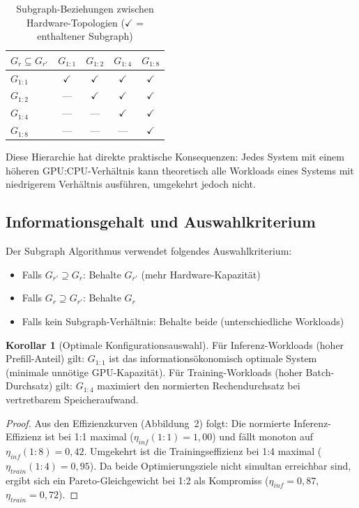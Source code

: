 ﻿\documentclass[a4paper,12pt]{article}
\theoremstyle{definition}
\newtheorem{korollar}{Korollar}
\begin{document}
\begin{table}[h!]
\centering
\caption{Subgraph-Beziehungen zwischen Hardware-Topologien ($\checkmark$ = enthaltener Subgraph)}
\begin{tabular}{l|cccc}
\toprule
$G_r \subseteq G_{r'}$ & $G_{1:1}$ & $G_{1:2}$ & $G_{1:4}$ & $G_{1:8}$ \\
\midrule
$G_{1:1}$ & $\checkmark$ & $\checkmark$ & $\checkmark$ & $\checkmark$ \\
$G_{1:2}$ & ---          & $\checkmark$ & $\checkmark$ & $\checkmark$ \\
$G_{1:4}$ & ---          & ---          & $\checkmark$ & $\checkmark$ \\
$G_{1:8}$ & ---          & ---          & ---          & $\checkmark$ \\
\bottomrule
\end{tabular}
\end{table}

Diese Hierarchie hat direkte praktische Konsequenzen: Jedes
System mit einem h\"oheren GPU:CPU-Verh\"altnis kann theoretisch
alle Workloads eines Systems mit niedrigerem Verh\"altnis ausf\"uhren,
umgekehrt jedoch nicht.

\subsection{Informationsgehalt und Auswahlkriterium}

Der Subgraph Algorithmus verwendet folgendes Auswahlkriterium:
\begin{itemize}
  \item Falls $G_{r'} \supseteq G_r$: Behalte $G_{r'}$ (mehr Hardware-Kapazit\"at)
  \item Falls $G_r \supseteq G_{r'}$: Behalte $G_r$
  \item Falls kein Subgraph-Verh\"altnis: Behalte beide (unterschiedliche Workloads)
\end{itemize}

\begin{korollar}[Optimale Konfigurationsauswahl]
  F\"ur Inferenz-Workloads (hoher Prefill-Anteil) gilt: $G_{1:1}$ ist das
  informations\"okonomisch optimale System (minimale unn\"otige GPU-Kapazit\"at).
  F\"ur Training-Workloads (hoher Batch-Durchsatz) gilt: $G_{1:4}$ maximiert
  den normierten Rechendurchsatz bei vertretbarem Speicheraufwand.
\end{korollar}

\begin{proof}
  Aus den Effizienzkurven (Abbildung~2) folgt: Die normierte Inferenz-Effizienz
  ist bei 1:1 maximal ($\eta_{inf}(1:1) = 1{,}00$) und f\"allt monoton auf
  $\eta_{inf}(1:8) = 0{,}42$. Umgekehrt ist die Trainingseffizienz bei 1:4 maximal
  ($\eta_{train}(1:4) = 0{,}95$). Da beide Optimierungsziele nicht simultan
  erreichbar sind, ergibt sich ein Pareto-Gleichgewicht bei 1:2 als Kompromiss
  ($\eta_{inf} = 0{,}87$, $\eta_{train} = 0{,}72$). \qedhere
\end{proof}
\end{document}
